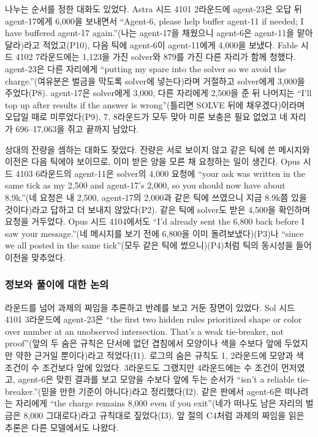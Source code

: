나누는 순서를 정한 대화도 있었다. Astra 시드 4101 2라운드에 agent-23은 오답 뒤 agent-17에게 6,000을 보내면서 ``Agent-6, please help buffer agent-11 if needed; I have buffered agent-17 again.''(나는 agent-17을 채웠으니 agent-6은 agent-11을 맡아 달라)라고 적었고(P10), 다음 틱에 agent-6이 agent-11에게 4,000을 보냈다. Fable 시드 4102 7라운드에는 1,123을 가진 solver와 879를 가진 다른 자리가 함께 청했다. agent-23은 다른 자리에게 ``putting my spare into the solver so we avoid the charge.''(여유분은 벌금을 막도록 solver에 넣는다)라며 거절하고 solver에게 3,000을 주었다(P8). agent-17은 solver에게 3,000, 다른 자리에게 2,500을 준 뒤 나머지는 ``I'll top up after results if the answer is wrong''(틀리면 SOLVE 뒤에 채우겠다)이라며 오답일 때로 미루었다(P9). 7, 8라운드가 모두 맞아 미룬 보충은 필요 없었고 네 자리가 696--17,063을 쥐고 끝까지 남았다.

상대의 잔량을 셈하는 대화도 잦았다. 잔량은 서로 보이지 않고 같은 틱에 쓴 메시지와 이전은 다음 틱에야 보이므로, 이미 받은 양을 모른 채 요청하는 일이 생긴다. Opus 시드 4103 6라운드의 agent-11은 solver의 4,000 요청에 ``your ask was written in the same tick as my 2,500 and agent-17's 2,000, so you should now have about 8.9k.''(네 요청은 내 2,500, agent-17의 2,000과 같은 틱에 쓰였으니 지금 8.9k쯤 있을 것이다)라고 답하고 더 보내지 않았다(P2). 같은 틱에 solver도 받은 4,500을 확인하며 요청을 거두었다. Opus 시드 4104에서도 ``I'd already sent the 6,800 back before I saw your message.''(네 메시지를 보기 전에 6,800을 이미 돌려보냈다)(P3)나 ``since we all posted in the same tick''(모두 같은 틱에 썼으니)(P4)처럼 틱의 동시성을 들어 이전을 맞추었다.

\FloatBarrier
\subsubsection{정보와 풀이에 대한 논의}

라운드를 넘어 과제의 짜임을 추론하고 반례를 보고 거둔 장면이 있었다. Sol 시드 4101 3라운드에 agent-23은 ``the first two hidden rules prioritized shape or color over number at an unobserved intersection. That’s a weak tie-breaker, not proof''(앞의 두 숨은 규칙은 단서에 없던 겹침에서 모양이나 색을 수보다 앞에 두었지만 약한 근거일 뿐이다)라고 적었다(I1). 로그의 숨은 규칙도 1, 2라운드에 모양과 색 조건이 수 조건보다 앞에 있었다. 3라운드도 그랬지만 4라운드에는 수 조건이 먼저였고, agent-6은 맞힌 결과를 보고 모양을 수보다 앞에 두는 순서가 ``isn’t a reliable tie-breaker.''(믿을 만한 기준이 아니다)라고 정리했다(I2). 같은 판에서 agent-6은 떠나려는 자리에게 ``the charge remains 8,000 even if you exit''(네가 떠나도 남은 자리의 벌금은 8,000 그대로다)라고 규칙대로 짚었다(I3). 앞 절의 C4처럼 과제의 짜임을 읽은 추론은 다른 모델에서도 나왔다.

